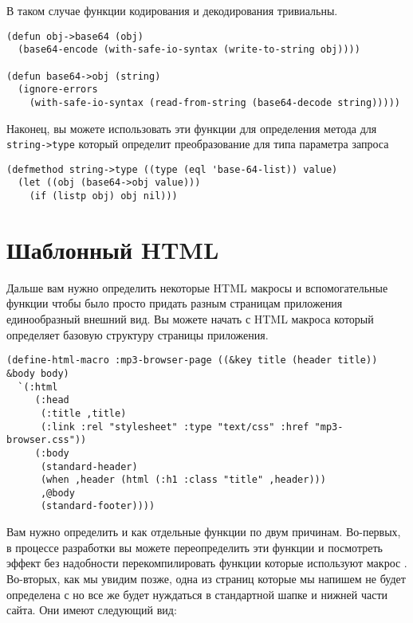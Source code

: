В таком случае функции кодирования и декодирования тривиальны.

\begin{lstlisting}
(defun obj->base64 (obj)
  (base64-encode (with-safe-io-syntax (write-to-string obj))))

(defun base64->obj (string)
  (ignore-errors
    (with-safe-io-syntax (read-from-string (base64-decode string)))))
\end{lstlisting}

Наконец, вы можете использовать эти функции для определения метода для
\lstinline!string->type! который определит преобразование для типа параметра запроса

\begin{lstlisting}
(defmethod string->type ((type (eql 'base-64-list)) value)
  (let ((obj (base64->obj value)))
    (if (listp obj) obj nil)))
\end{lstlisting}

\section{Шаблонный HTML}

Дальше вам нужно определить некоторые HTML макросы и вспомогательные функции чтобы было
просто придать разным страницам приложения единообразный внешний вид. Вы можете начать с
HTML макроса который определяет базовую структуру страницы приложения.

\begin{lstlisting}
(define-html-macro :mp3-browser-page ((&key title (header title)) &body body)
  `(:html
     (:head
      (:title ,title)
      (:link :rel "stylesheet" :type "text/css" :href "mp3-browser.css"))
     (:body
      (standard-header)
      (when ,header (html (:h1 :class "title" ,header)))
      ,@body
      (standard-footer))))
\end{lstlisting}

Вам нужно определить  и  как отдельные функции
по двум причинам. Во-первых, в процессе разработки вы можете переопределить эти функции и
посмотреть эффект без надобности перекомпилировать функции которые используют
макрос . Во-вторых, как мы увидим позже, одна из страниц которые
мы напишем не будет определена с  но все же будет нуждаться в
стандартной шапке и нижней части сайта. Они имеют следующий вид:

